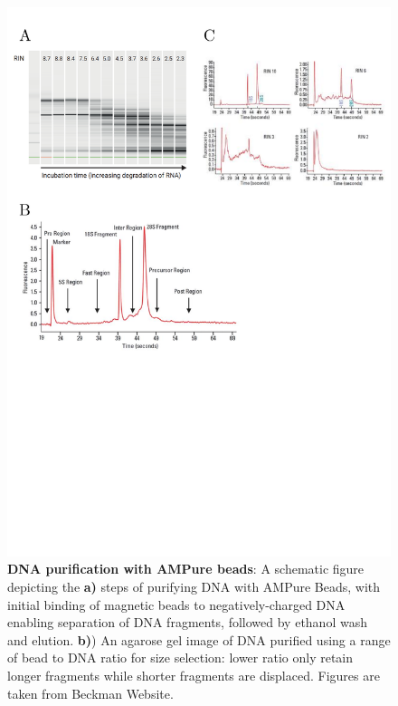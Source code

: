 \begin{figure}[!h]
	\centering
	\includegraphics[page=3,trim={0 8cm 0 0cm},clip, scale = 0.7]{Figures/General_Methodology_Figures.pdf}
	\captionsetup{width=0.95\textwidth}
	\caption[DNA purification with AMPure beads]%
	{\textbf{DNA purification with AMPure beads}: A schematic figure depicting the \textbf{a)} steps of purifying DNA with AMPure Beads, with initial binding of magnetic beads to negatively-charged DNA enabling separation of DNA fragments, followed by ethanol wash and elution. \textbf{b)}) An agarose gel image of DNA purified using a range of bead to DNA ratio for size selection: lower ratio only retain longer fragments while shorter fragments are displaced. Figures are taken from Beckman Website.}
	\label{fig:ampure_bead_workflow}
\end{figure}

\clearpage
